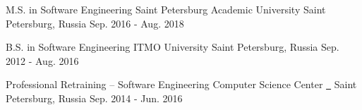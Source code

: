 

\begin{cventries}

  \cventry
    {M.S. in Software Engineering} %
    {Saint Petersburg Academic University} %
    {Saint Petersburg, Russia} %
    {Sep. 2016 - Aug. 2018} %
    {} %

  \cventry
    {B.S. in Software Engineering}
    {ITMO University}
    {Saint Petersburg, Russia}
    {Sep. 2012 - Aug. 2016}
    {}

  \cventry
    {Professional Retraining -- Software Engineering}
    {Computer Science Center \href{https://compscicenter.ru/students/752/}{\ \faLink}}
    {Saint Petersburg, Russia}
    {Sep. 2014 - Jun. 2016}
    {}

\end{cventries}

